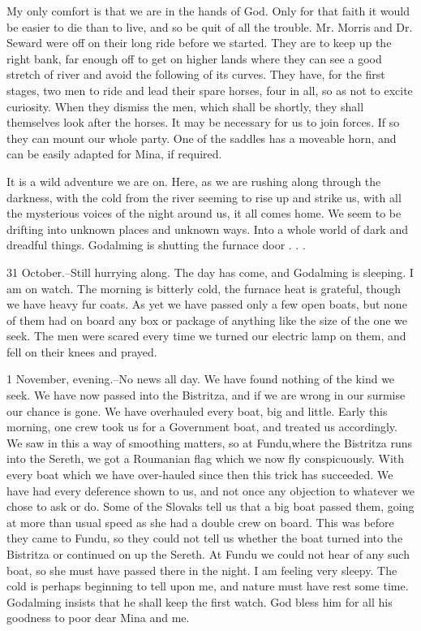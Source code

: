 My only comfort is that we are in the hands of God. Only for that faith it would be easier to die than to live, and so be quit of all the trouble. Mr. Morris and Dr. Seward were off on their long ride before we started. They are to keep up the right bank, far enough off to get on higher lands where they can see a good stretch of river and avoid the following of its curves. They have, for the first stages, two men to ride and lead their spare horses, four in all, so as not to excite curiosity. When they dismiss the men, which shall be shortly, they shall themselves look after the horses. It may be necessary for us to join forces. If so they can mount our whole party. One of the saddles has a moveable horn, and can be easily adapted for Mina, if required. 

It is a wild adventure we are on. Here, as we are rushing along through the darkness, with the cold from the river seeming to rise up and strike us, with all the mysterious voices of the night around us, it all comes home. We seem to be drifting into unknown places and unknown ways. Into a whole world of dark and dreadful things. Godalming is shutting the furnace door . . . 

31 October.--Still hurrying along. The day has come, and Godalming is sleeping. I am on watch. The morning is bitterly cold, the furnace heat is grateful, though we have heavy fur coats. As yet we have passed only a few open boats, but none of them had on board any box or package of anything like the size of the one we seek. The men were scared every time we turned our electric lamp on them, and fell on their knees and prayed. 

1 November, evening.--No news all day. We have found nothing of the kind we seek. We have now passed into the Bistritza, and if we are wrong in our surmise our chance is gone. We have overhauled every boat, big and little. Early this morning, one crew took us for a Government boat, and treated us accordingly. We saw in this a way of smoothing matters, so at Fundu,where the Bistritza runs into the Sereth, we got a Roumanian flag which we now fly conspicuously. With every boat which we have over-hauled since then this trick has succeeded. We have had every deference shown to us, and not once any objection to whatever we chose to ask or do. Some of the Slovaks tell us that a big boat passed them, going at more than usual speed as she had a double crew on board. This was before they came to Fundu, so they could not tell us whether the boat turned into the Bistritza or continued on up the Sereth. At Fundu we could not hear of any such boat, so she must have passed there in the night. I am feeling very sleepy. The cold is perhaps beginning to tell upon me, and nature must have rest some time. Godalming insists that he shall keep the first watch. God bless him for all his goodness to poor dear Mina and me. 

